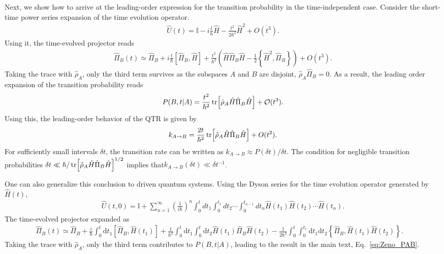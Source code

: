 \documentclass[prl,aps,amssymb,twocolumn,superscriptaddress, notitlepage, longbibliography]{revtex4-2}
\begin{document}
Next, we show how to arrive at the leading-order expression for the transition probability in the time-independent case. Consider the short-time power series expansion of the time evolution operator.
\begin{eqnarray}
    \hat U(t)=\mathbb I-i\frac{t}{\hbar}\hat H-\frac{t^2}{2\hbar^2}\hat H^2+O(t^3).
\end{eqnarray}
Using it, the time-evolved projector reads
\begin{eqnarray}
    \hat \Pi_B(t)\simeq \hat\Pi_B+i\frac{t}{\hbar}[\hat\Pi_B,\hat H]+\frac{t^2}{\hbar^2}\left(\hat{H}\hat{\Pi}_B \hat{H}-\frac{1}{2}\left\{\hat{H}^2,\hat{\Pi}_B\right\}\right)+O(t^3).
\end{eqnarray}
Taking the trace with $\hat\rho_A$, only the third term survives as the subspaces $A$ and $B$ are disjoint, $\hat\rho_A\hat\Pi_B=0$. As a result, the leading order expansion of the transition probability reads
\begin{eqnarray}
    P(B,t\vert A)=\frac{t^2}{\hbar^2}\tr[\hat{\rho}_A\hat{H}\hat{\Pi}_B \hat{H}]+\mathcal{O}(t^3).
    \end{eqnarray}
Using this, the leading-order behavior of the QTR is given by
\begin{eqnarray}
    k_{A\rightarrow B}=\frac{2t}{\hbar^2}\tr[\hat{\rho}_A\hat{H}\hat{\Pi}_B \hat{H}]+O(t^2).
\end{eqnarray}
For sufficiently small intervals $\delta t$, the transition rate can be written as
$k_{A\rightarrow B}\approx P(\delta t)/\delta t$. The condition for negligible transition probabilities $\delta t\ll \hbar/\tr[\hat{\rho}_A\hat{H}\hat{\Pi}_B \hat{H}]^{1/2}$ implies that$k_{A\rightarrow B}(\delta t)\ll \delta t^{-1}$.



One can also generalize this conclusion to driven quantum systems.
Using the Dyson series for the time evolution operator generated by $\hat{H}(t)$,
\begin{eqnarray}
\hat{U}(t,0)=\mathbb{I}+\sum_{n=1}^\infty\left(\frac{1}{i\hbar}\right)^n \int_0^tdt_1\int_0^{t_1}dt_2\cdots\int_{0}^{t_{n-1}}dt_n\hat{H}(t_1)\hat{H}(t_2)\cdots \hat{H}(t_n).
\end{eqnarray}
The time-evolved projector expanded as
\begin{eqnarray}
    \hat \Pi_B(t)\simeq \hat\Pi_B+\frac{i}{\hbar}\int_0^t\mathrm dt_1[\hat\Pi_B,\hat H(t_1)]+\frac{1}{\hbar^2}\int_0^t\mathrm dt_1\int_0^t\mathrm dt_2\hat{H}(t_1)\hat{\Pi}_B \hat{H}(t_2)-\frac{1}{2\hbar^2}\int_0^t\int_0^{t_1}\mathrm dt_1\mathrm dt_2\left\{\hat{\Pi}_B,\hat{H}(t_1)\hat H(t_2)\right\}.\quad
\end{eqnarray}
Taking the trace with $\hat\rho_A$, only the third term contributes to $P(B,t|A)$, leading to the result in the main text, Eq.~\eqref{eq:Zeno_PAB}.
\end{document}
